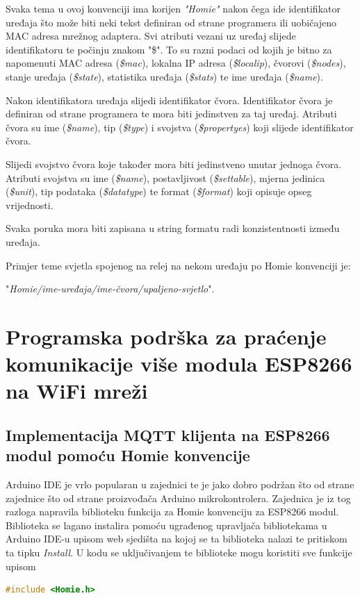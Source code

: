 \documentclass[times, utf8, zavrsni]{fer}
\begin{document}
Svaka tema u ovoj konvenciji ima korijen \textit{"Homie"} nakon čega ide identifikator uređaja što može biti neki tekst definiran od strane programera ili uobičajeno MAC adresa mrežnog adaptera.
Svi atributi vezani uz uređaj slijede identifikatoru te počinju znakom "\$".
To su razni podaci od kojih je bitno za napomenuti MAC adresa (\textit{\$mac}), lokalna IP adresa (\textit{\$localip}), čvorovi (\textit{\$nodes}), stanje uređaja (\textit{\$state}), statistika uređaja (\textit{\$stats}) te ime uređaja (\textit{\$name}).

Nakon identifikatora uređaja slijedi identifikator čvora.
Identifikator čvora je definiran od strane programera te mora biti jedinstven za taj uređaj.
Atributi čvora su ime (\textit{\$name}), tip (\textit{\$type}) i svojstva (\textit{\$propertyes}) koji slijede identifikator čvora.

Slijedi svojstvo čvora koje također mora biti jedinstveno unutar jednoga čvora.
Atributi svojstva su ime (\textit{\$name}), postavljivost (\textit{\$settable}), mjerna jedinica (\textit{\$unit}), tip podataka (\textit{\$datatype}) te format (\textit{\$format}) koji opisuje opseg vrijednosti.

Svaka poruka mora biti zapisana u string formatu radi konzistentnosti između uređaja.

Primjer teme svjetla spojenog na relej na nekom uređaju po Homie konvenciji je:

"\textit{Homie/ime-uređaja/ime-čvora/upaljeno-svjetlo}".

\chapter{Programska podrška za praćenje komunikacije više modula ESP8266 na WiFi mreži}
\section{Implementacija MQTT klijenta na ESP8266 modul pomoću Homie konvencije}
Arduino IDE je vrlo popularan u zajednici te je jako dobro podržan što od strane zajednice što od strane proizvođača Arduino mikrokontrolera.
Zajednica je iz tog razloga napravila biblioteku funkcija za Homie konvenciju za ESP8266 modul.
Biblioteka se lagano instalira pomoću ugrađenog upravljača bibliotekama u Arduino IDE-u upisom web sjedišta na kojoj se ta biblioteka nalazi te pritiskom ta tipku \textit{Install}.
U kodu se uključivanjem te biblioteke mogu koristiti sve funkcije upisom
\begin{lstlisting}[language=c++, caption=Uključivanje Homie biblioteke]
    #include <Homie.h>
\end{lstlisting}
\end{document}
